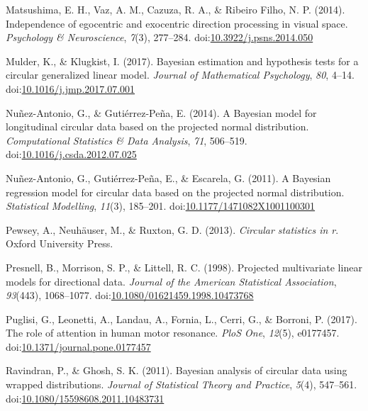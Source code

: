 \documentclass[11pt,]{article}
\begin{document}
\leavevmode\hypertarget{ref-matsushima2014independence}{}%
Matsushima, E. H., Vaz, A. M., Cazuza, R. A., \& Ribeiro Filho, N. P.
(2014). Independence of egocentric and exocentric direction processing
in visual space. \emph{Psychology \& Neuroscience}, \emph{7}(3),
277--284.
doi:\href{https://doi.org/10.3922/j.psns.2014.050}{10.3922/j.psns.2014.050}

\leavevmode\hypertarget{ref-mulder2017bayesian}{}%
Mulder, K., \& Klugkist, I. (2017). Bayesian estimation and hypothesis
tests for a circular generalized linear model. \emph{Journal of
Mathematical Psychology}, \emph{80}, 4--14.
doi:\href{https://doi.org/10.1016/j.jmp.2017.07.001}{10.1016/j.jmp.2017.07.001}

\leavevmode\hypertarget{ref-nunez2014bayesian}{}%
Nuñez-Antonio, G., \& Gutiérrez-Peña, E. (2014). A Bayesian model for
longitudinal circular data based on the projected normal distribution.
\emph{Computational Statistics \& Data Analysis}, \emph{71}, 506--519.
doi:\href{https://doi.org/10.1016/j.csda.2012.07.025}{10.1016/j.csda.2012.07.025}

\leavevmode\hypertarget{ref-nunez2011bayesian}{}%
Nuñez-Antonio, G., Gutiérrez-Peña, E., \& Escarela, G. (2011). A
Bayesian regression model for circular data based on the projected
normal distribution. \emph{Statistical Modelling}, \emph{11}(3),
185--201.
doi:\href{https://doi.org/10.1177/1471082X1001100301}{10.1177/1471082X1001100301}

\leavevmode\hypertarget{ref-pewsey2013circular}{}%
Pewsey, A., Neuhäuser, M., \& Ruxton, G. D. (2013). \emph{Circular
statistics in r}. Oxford University Press.

\leavevmode\hypertarget{ref-presnell1998projected}{}%
Presnell, B., Morrison, S. P., \& Littell, R. C. (1998). Projected
multivariate linear models for directional data. \emph{Journal of the
American Statistical Association}, \emph{93}(443), 1068--1077.
doi:\href{https://doi.org/10.1080/01621459.1998.10473768}{10.1080/01621459.1998.10473768}

\leavevmode\hypertarget{ref-puglisi2017role}{}%
Puglisi, G., Leonetti, A., Landau, A., Fornia, L., Cerri, G., \&
Borroni, P. (2017). The role of attention in human motor resonance.
\emph{PloS One}, \emph{12}(5), e0177457.
doi:\href{https://doi.org/10.1371/journal.pone.0177457}{10.1371/journal.pone.0177457}

\leavevmode\hypertarget{ref-ravindran2011bayesian}{}%
Ravindran, P., \& Ghosh, S. K. (2011). Bayesian analysis of circular
data using wrapped distributions. \emph{Journal of Statistical Theory
and Practice}, \emph{5}(4), 547--561.
doi:\href{https://doi.org/10.1080/15598608.2011.10483731}{10.1080/15598608.2011.10483731}
\end{document}
